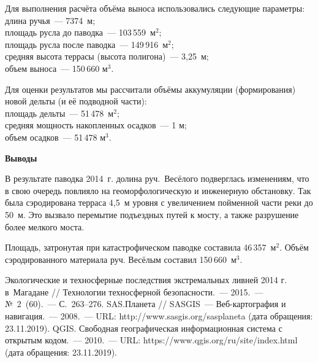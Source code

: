 Для выполнения расчёта объёма выноса использовались следующие параметры:\\
длина ручья~--- 7374 м;\\
площадь русла до паводка~--- 103\,559~м$^2$;\\
площадь русла после паводка~--- 149\,916~м$^2$;\\
средняя высота террасы (высота полигона)~--- 3,25~м;\\
объем выноса~--- 150\,660 м$^3$.

Для оценки результатов мы рассчитали объёмы аккумуляции (формирования) новой дельты (и её подводной части):\\
площадь дельты~--- 51\,478~м$^2$;\\
средняя мощность накопленных осадков~--- 1 м;\\
объем осадков~--- 51\,478 м$^3$.

\textbf{Выводы}

В результате паводка 2014~г. долина руч.~Весёлого подверглась изменениям, что в свою очередь повлияло на геоморфологическую и инженерную обстановку. Так была сэродирована терраса 4,5~м уровня с увеличением пойменной части реки до 50~м. Это вызвало перемытие подъездных путей к мосту, а также разрушение более мелкого моста.

Площадь, затронутая при катастрофическом паводке составила 46\,357~м$^2$. Объём сэродированного материала руч. Весёлым составил 150\,660~м$^3$.


\begin{thebibliography}{99}

\bibitem{} Экологические и техносферные последствия экстремальных ливней 2014 г. в~Магадане // Технологии техносферной безопасности.~--- 2015.~--- №~2~(60).~--- С.~263--276.
\bibitem{}SAS.Планета // SASGIS~--- Веб-картография и навигация.~--- 2008.~--- URL: http://www.sasgis.org/sasplaneta (дата обращения: 23.11.2019).
\bibitem{}QGIS. Свободная географическая информационная система с открытым кодом.~--- 2010.~--- URL: https://www.qgis.org/ru/site/index.html (дата обращения: 23.11.2019).
    \end{thebibliography}
